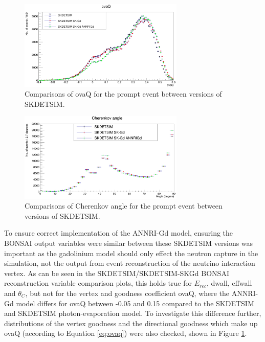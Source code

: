\begin{figure}[htp]
    \centering
    \includegraphics[width=0.7\textwidth]{Figures/ovaQ_compare.png}
    \caption{Comparisons of ovaQ for the prompt event between versions of SKDETSIM.}
    \label{fig:ovaQ_compare}

\end{figure}

\begin{figure}[htp]
    \centering
    \includegraphics[width=0.7\textwidth]{Figures/thetaC_compare.png}
    \caption{Comparisons of Cherenkov angle for the prompt event between versions of SKDETSIM.}
    \label{fig:thetaC_compare}

\end{figure}


To ensure correct implementation of the ANNRI-Gd model, ensuring the BONSAI output variables were similar between these SKDETSIM versions was important as the gadolinium model should only effect the neutron capture in the simulation, not the output from event reconstruction of the neutrino interaction vertex. As can be seen in the SKDETSIM/SKDETSIM-SKGd BONSAI reconstruction variable comparison plots, this holds true for $E_{rec}$, dwall, effwall and $\theta_C$, but not for the vertex and goodness coefficient ovaQ, where the ANNRI-Gd model differs for ovaQ between -0.05 and 0.15 compared to the SKDETSIM and SKDETSIM photon-evaporation model. To investigate this difference further, distributions of the vertex goodness and the directional goodness which make up ovaQ (according to Equation \ref{eq:ovaq}) were also checked, shown in Figure \ref{fig:ovaQ_compare}.



